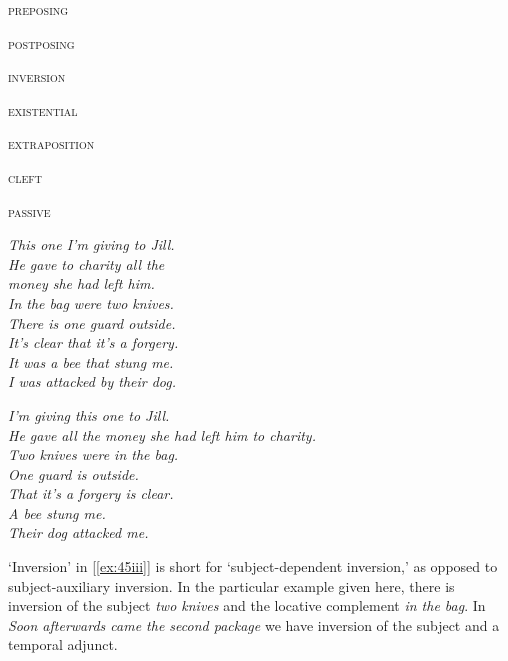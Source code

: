 \begin{examples}
\item \label{ex:45}
\noindent\begin{minipage}[t]{0.25\linewidth}\vspace{-6pt}
    \begin{examples}
        \item\label{ex:45i}\textsc{preposing}
        \item\label{ex:45ii}\textsc{postposing}\\
        \item\label{ex:45iii}\textsc{inversion}
        \item\label{ex:45iv}\textsc{existential}
        \item\label{ex:45v}\textsc{extraposition}
        \item\label{ex:45vi}\textsc{cleft}
        \item\label{ex:45vii}\textsc{passive}
    \end{examples}
\end{minipage}
\begin{minipage}[t]{0.375\linewidth}{
    \textit{This one I'm giving to Jill.}\\
    \textit{He gave to charity all the\\money she had left him.}\\
    \textit{In the bag were two knives.}\\
    \textit{There is one guard outside.}\\
    \textit{It's clear that it's a forgery.}\\
    \textit{It was a bee that stung me.}\\
    \textit{I was attacked by their dog.}}
\end{minipage}
\begin{minipage}[t]{0.375\linewidth}
    \textit{I'm giving this one to Jill.}\\
    \textit{He gave all the money she had left him to charity.}\\
    \textit{Two knives were in the bag.}\\
    \textit{One guard is outside.}\\
    \textit{That it's a forgery is clear.}\\
    \textit{A bee stung me.}\\
    \textit{Their dog attacked me.}\\
\end{minipage}
\end{examples}\vspace{-6pt}
`Inversion' in [\ref{ex:45iii}] is short for `subject-dependent inversion,' as opposed to subject-auxiliary inversion. In the particular example given here, there is inversion of the subject \textit{two knives} and the locative complement \textit{in the bag}. In \textit{Soon afterwards came the second package} we have inversion of the subject and a temporal adjunct.

